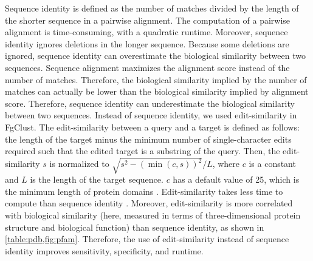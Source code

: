 \documentclass[11pt,letterpaper]{llncs2e/llncs}
\begin{document}
Sequence identity is defined as the number of matches divided by the length of the shorter sequence in a pairwise alignment.
The computation of a pairwise alignment is time-consuming, with a quadratic runtime. 
Moreover, sequence identity ignores deletions in the longer sequence.
Because some deletions are ignored, sequence identity can overestimate the biological similarity between two sequences.
Sequence alignment maximizes the alignment score instead of the number of matches.
Therefore, the biological similarity implied by the number of matches can actually be lower than the biological similarity implied by alignment score.
Therefore, sequence identity can underestimate the biological similarity between two sequences.
Instead of sequence identity, we used edit-similarity in FgClust.
The edit-similarity between a query and a target is defined as follows: 
	the length of the target minus the minimum number of single-character edits required such that the edited target is a substring of the query.
Then, the edit-similarity \(s\) is normalized to \(\sqrt{ s^2-(\min(c,s))^2}/L\), where \(c\) is a constant and \(L\) is the length of the target sequence.
\(c\) has a default value of 25, which is the minimum length of protein domains \citep[page 8]{niazi2016biosimilars}.
Edit-similarity takes less time to compute than sequence identity \citep{vsovsic2017edlib}.
Moreover, edit-similarity is more correlated with biological similarity (here, measured in terms of three-dimensional protein structure and biological function) than sequence identity, as shown in \cref{table:pdb,fig:pfam}.
Therefore, the use of edit-similarity instead of sequence identity improves sensitivity, specificity, and runtime.
\label{para:edsim}
\end{document}
